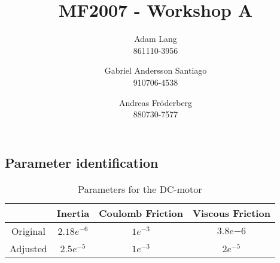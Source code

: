 \documentclass[12pt,a4paper]{article}
\title{MF2007 - Workshop A}
\author{
Adam Lang \\ 861110-3956
\and
Gabriel Andersson Santiago \\ 910706-4538
\and 
Andreas Fr\"oderberg \\ 880730-7577
}
\begin{document}
\maketitle

\subsection*{Parameter identification}

\begin{center}
  \begin{table}[H]
    \centering
    \caption{Parameters for the DC-motor}
    
\begin{tabular}{|c|c|c|c|}
  \hline
    & Inertia & Coulomb Friction & Viscous Friction \\ 
    \hline
    Original & $2.18e^{-6}$ & $1e^{-3}$ & $3.8e{-6}$ \\
    \hline
    Adjusted & $2.5e^{-5}$ & $1e^{-3}$ & $2e^{-5}$ \\
    \hline
    \end{tabular}
   \label{tab:parameters}
  \end{table}
\end{center}
\end{document}
